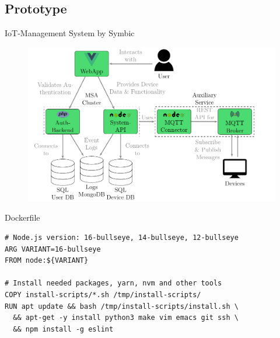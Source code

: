 \documentclass{beamer}
\begin{document}
\subsection{Prototype}
\begin{frame}{}
  \vspace{-0.2cm}
  \begin{center}
    \large IoT-Management System by Symbic
  \end{center}
  \vspace{-0.2cm}
  \begin{figure}
    \includegraphics[width=\textwidth]{img/project.pdf}
  \end{figure}
\end{frame}

\begin{frame}[fragile]{Dockerfile}
  \begin{lstlisting}[language=docker, frame=single, basicstyle=\footnotesize, caption={NodeJS DevContainer Dockerfile},label=code::docker_dev_node]
# Node.js version: 16-bullseye, 14-bullseye, 12-bullseye
ARG VARIANT=16-bullseye
FROM node:${VARIANT}

# Install needed packages, yarn, nvm and other tools
COPY install-scripts/*.sh /tmp/install-scripts/
RUN apt update && bash /tmp/install-scripts/install.sh \
  && apt-get -y install python3 make vim emacs git ssh \
  && npm install -g eslint
      \end{lstlisting}
\end{frame}
\end{document}
